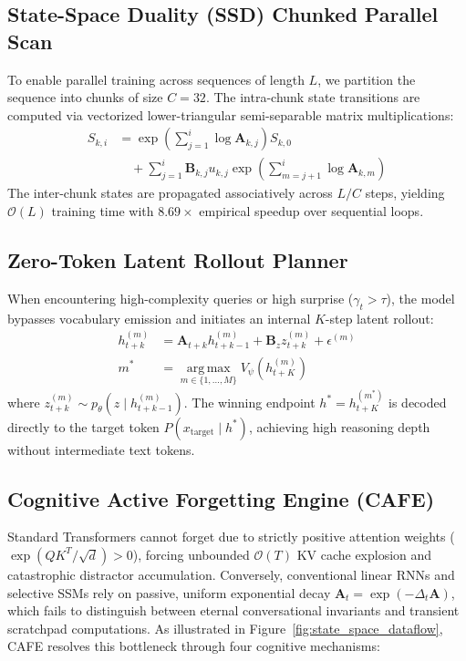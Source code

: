\subsection{State-Space Duality (SSD) Chunked Parallel Scan}
To enable parallel training across sequences of length $L$, we partition the sequence into chunks of size $C=32$.
The intra-chunk state transitions are computed via vectorized lower-triangular semi-separable matrix multiplications:
\begin{equation}
\begin{split}
    S_{k, i} &= \exp\left(\sum_{j=1}^i \log \mathbf{A}_{k,j}\right) S_{k, 0} \\
    &\quad + \sum_{j=1}^i \mathbf{B}_{k,j} u_{k,j} \exp\left(\sum_{m=j+1}^i \log \mathbf{A}_{k,m}\right)
\end{split}
\end{equation}
The inter-chunk states are propagated associatively across $L/C$ steps, yielding $\mathcal{O}(L)$ training time with $8.69\times$ empirical speedup over sequential loops.

\subsection{Zero-Token Latent Rollout Planner}
When encountering high-complexity queries or high surprise ($\gamma_t > \tau$), the model bypasses vocabulary emission and initiates an internal $K$-step latent rollout:
\begin{align}
    h_{t+k}^{(m)} &= \mathbf{A}_{t+k} h_{t+k-1}^{(m)} + \mathbf{B}_z z_{t+k}^{(m)} + \epsilon^{(m)} \\
    m^* &= \operatorname*{arg\,max}_{m \in \{1,\dots,M\}} V_\psi\left( h_{t+K}^{(m)} \right)
\end{align}
where $z_{t+k}^{(m)} \sim p_\theta(z \mid h_{t+k-1}^{(m)})$. The winning endpoint $h^* = h_{t+K}^{(m^*)}$ is decoded directly to the target token $P(x_{\mathrm{target}} \mid h^*)$, achieving high reasoning depth without intermediate text tokens.

\subsection{Cognitive Active Forgetting Engine (CAFE)}
\label{sec:cafe}
Standard Transformers cannot forget due to strictly positive attention weights ($\exp(QK^T/\sqrt{d}) > 0$), forcing unbounded $\mathcal{O}(T)$ KV cache explosion and catastrophic distractor accumulation. Conversely, conventional linear RNNs and selective SSMs rely on passive, uniform exponential decay $\mathbf{A}_t = \exp(-\Delta_t \mathbf{A})$, which fails to distinguish between eternal conversational invariants and transient scratchpad computations.
As illustrated in Figure~\ref{fig:state_space_dataflow}, CAFE resolves this bottleneck through four cognitive mechanisms:


